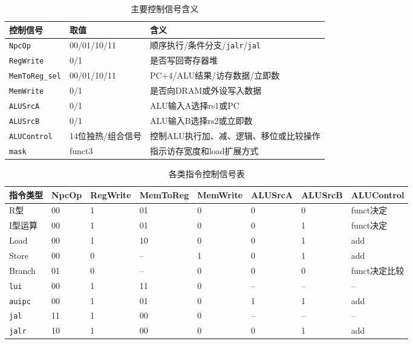 \documentclass[12pt,a4paper]{ctexart}
\newcommand{\code}[1]{\texttt{#1}}
\begin{document}
\begin{table}[H]
	\centering
	\caption{主要控制信号含义}
	\begin{tabularx}{\textwidth}{p{3cm}p{3cm}X}
		\toprule
		控制信号                 & 取值          & 含义                               \\
		\midrule
		\code{NpcOp}         & 00/01/10/11 & 顺序执行/条件分支/\code{jalr}/\code{jal} \\
		\code{RegWrite}      & 0/1         & 是否写回寄存器堆                         \\
		\code{MemToReg\_sel} & 00/01/10/11 & PC+4/ALU结果/访存数据/立即数              \\
		\code{MemWrite}      & 0/1         & 是否向DRAM或外设写入数据                   \\
		\code{ALUSrcA}       & 0/1         & ALU输入A选择rs1或PC                   \\
		\code{ALUSrcB}       & 0/1         & ALU输入B选择rs2或立即数                  \\
		\code{ALUControl}    & 14位独热/组合信号  & 控制ALU执行加、减、逻辑、移位或比较操作            \\
		\code{mask}          & funct3      & 指示访存宽度和load扩展方式                  \\
		\bottomrule
	\end{tabularx}
\end{table}

\begin{table}[H]
	\centering
	\caption{各类指令控制信号表}
	\scriptsize
	\begin{tabularx}{\textwidth}{p{2cm}p{1.2cm}p{1.4cm}p{1.6cm}p{1.4cm}p{1.4cm}p{1.4cm}X}
		\toprule
		指令类型         & NpcOp & RegWrite & MemToReg & MemWrite & ALUSrcA & ALUSrcB & ALUControl \\
		\midrule
		R型           & 00    & 1        & 01       & 0        & 0       & 0       & funct决定    \\
		I型运算         & 00    & 1        & 01       & 0        & 0       & 1       & funct决定    \\
		Load         & 00    & 1        & 10       & 0        & 0       & 1       & add        \\
		Store        & 00    & 0        & --       & 1        & 0       & 1       & add        \\
		Branch       & 01    & 0        & --       & 0        & 0       & 0       & funct决定比较  \\
		\code{lui}   & 00    & 1        & 11       & 0        & --      & --      & --         \\
		\code{auipc} & 00    & 1        & 01       & 0        & 1       & 1       & add        \\
		\code{jal}   & 11    & 1        & 00       & 0        & --      & --      & --         \\
		\code{jalr}  & 10    & 1        & 00       & 0        & 0       & 1       & add        \\
		\bottomrule
	\end{tabularx}
\end{table}
\end{document}
